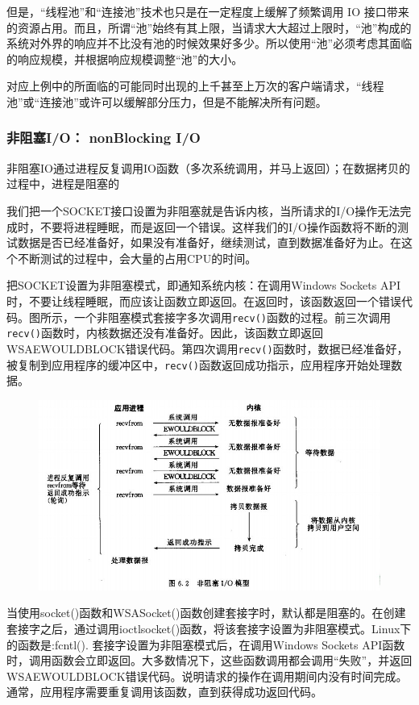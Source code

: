 \documentclass[UTF8,a4paper,12pt]{ctexbook}
\begin{document}
			但是，“线程池”和“连接池”技术也只是在一定程度上缓解了频繁调用 IO 接口带来的资源占用。而且，所谓“池”始终有其上限，当请求大大超过上限时，“池”构成的系统对外界的响应并不比没有池的时候效果好多少。所以使用“池”必须考虑其面临的响应规模，并根据响应规模调整“池”的大小。
			
			对应上例中的所面临的可能同时出现的上千甚至上万次的客户端请求，“线程池”或“连接池”或许可以缓解部分压力，但是不能解决所有问题。
			
			\subsubsection{非阻塞I/O： nonBlocking I/O}
			非阻塞IO通过进程反复调用IO函数（多次系统调用，并马上返回）；在数据拷贝的过程中，进程是阻塞的
			
			我们把一个SOCKET接口设置为非阻塞就是告诉内核，当所请求的I/O操作无法完成时，不要将进程睡眠，而是返回一个错误。这样我们的I/O操作函数将不断的测试数据是否已经准备好，如果没有准备好，继续测试，直到数据准备好为止。在这个不断测试的过程中，会大量的占用CPU的时间。
			
			把SOCKET设置为非阻塞模式，即通知系统内核：在调用Windows Sockets API时，不要让线程睡眠，而应该让函数立即返回。在返回时，该函数返回一个错误代码。图所示，一个非阻塞模式套接字多次调用\verb|recv()|函数的过程。前三次调用\verb|recv()|函数时，内核数据还没有准备好。因此，该函数立即返回WSAEWOULDBLOCK错误代码。第四次调用\verb|recv()|函数时，数据已经准备好，被复制到应用程序的缓冲区中，\verb|recv()|函数返回成功指示，应用程序开始处理数据。
			
			\begin{figure}[h]
				\centering
				\includegraphics[scale = 0.8]{figures/nonBlockingIO.jpg}
			\end{figure}
			
			当使用socket()函数和WSASocket()函数创建套接字时，默认都是阻塞的。在创建套接字之后，通过调用ioctlsocket()函数，将该套接字设置为非阻塞模式。Linux下的函数是:fcntl().
			套接字设置为非阻塞模式后，在调用Windows Sockets API函数时，调用函数会立即返回。大多数情况下，这些函数调用都会调用“失败”，并返回WSAEWOULDBLOCK错误代码。说明请求的操作在调用期间内没有时间完成。通常，应用程序需要重复调用该函数，直到获得成功返回代码。
			
\end{document}
